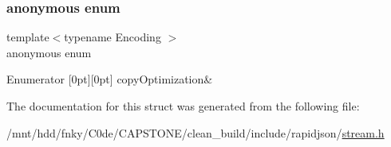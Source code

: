 \subsubsection{\texorpdfstring{anonymous enum}{anonymous enum}}
{\footnotesize\ttfamily template$<$typename Encoding $>$ \\
anonymous enum}

\begin{DoxyEnumFields}{Enumerator}
[0pt][0pt]{}\mbox{\label{structStreamTraits_3_01GenericStringStream_3_01Encoding_01_4_01_4_ac055740d6433e887c968d1aa73c9559baaeb90f06c2d643f47563c64eb8d4cda7}} 
copy\+Optimization&\\
\hline

\end{DoxyEnumFields}


The documentation for this struct was generated from the following file\+:\begin{DoxyCompactItemize}
\item 
/mnt/hdd/fnky/\+C0de/\+C\+A\+P\+S\+T\+O\+N\+E/clean\+\_\+build/include/rapidjson/\hyperlink{stream_8h}{stream.\+h}\end{DoxyCompactItemize}
